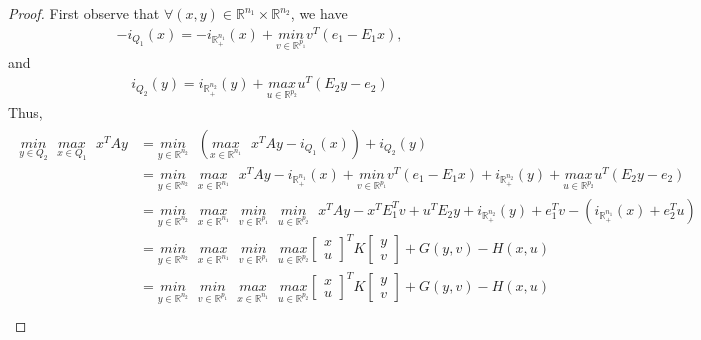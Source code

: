 \documentclass{article} %
\begin{document}
\begin{proof} First observe that $\forall (x, y) \in \mathbb{R}^{n_1} \times \mathbb{R}^{n_2}$, we have
  \begin{eqnarray*}
   -i_{Q_1}(x) = -i_{\mathbb{R}^{n_1}_+}(x) + \underset{v \in \mathbb{R}^{p_1}}{min}\text{}{v^T(e_1 - E_1x)},
      \end{eqnarray*}
  and
\begin{eqnarray*}
  i_{Q_2}(y) = i_{\mathbb{R}^{n_2}_+}(y) + \underset{u \in \mathbb{R}^{p_2}}{max}\text{}{u^T(E_2y - e_2)}
\end{eqnarray*}
  Thus,%
  \begin{eqnarray*}
    \begin{split}
  \underset{y \in Q_2}{min}\text{ }\underset{x \in Q_1}{max}\text{ }{x^TAy} &=
  \underset{y \in \mathbb{R}^{n_2}}{min}\text{ }\left(\underset{x \in \mathbb{R}^{n_1}}{max}\text{ }
x^TAy - i_{Q_1}(x)\right) + i_{Q_2}(y) \\
&= \underset{y \in \mathbb{R}^{n_2}}{min}\text{ }\underset{x \in \mathbb{R}^{n_1}}{max}\text{ }x^TAy -i_{\mathbb{R}^{n_1}_+}(x) + \underset{v \in \mathbb{R}^{p_1}}{min}\text{}{v^T(e_1 - E_1x)} + i_{\mathbb{R}^{n_2}_+}(y) + \underset{u \in \mathbb{R}^{p_2}}{max}\text{}{u^T(E_2y - e_2)}\\
      &= \underset{y \in \mathbb{R}^{n_2}}{min}\text{ }\underset{x \in \mathbb{R}^{n_1}}{max}\text{ }\underset{v \in \mathbb{R}^{p_1}}{min}\text{ }\underset{u \in \mathbb{R}^{p_2}}{min}\text{ }x^TAy - x^TE_1^Tv + u^TE_2y + i_{\mathbb{R}^{n_2}_+}(y) + e_1^Tv -(i_{\mathbb{R}^{n_1}_+}(x) + e_2^Tu)\\
      &= \underset{y \in \mathbb{R}^{n_2}}{min}\text{ }\underset{x \in \mathbb{R}^{n_1}}{max}\text{ } \underset{v\in \mathbb{R}^{p_1}}{min}\text{ }\underset{u \in \mathbb{R}^{p_2}}{max}
      {\begin{bmatrix}x\\u\end{bmatrix}^TK\begin{bmatrix}y\\v\end{bmatrix} + G(y, v) - H(x, u)}\\
      &= \underset{y \in \mathbb{R}^{n_2}}{min}\text{ }\underset{v\in \mathbb{R}^{p_1}}{min}\text{ }\underset{x \in \mathbb{R}^{n_1}}{max}\text{ }
\underset{u \in \mathbb{R}^{p_2}}{max}
      {\begin{bmatrix}x\\u\end{bmatrix}^TK\begin{bmatrix}y\\v\end{bmatrix} + G(y, v) - H(x, u)}\\

\end{split}
\end{eqnarray*}
\end{proof}
\end{document}
